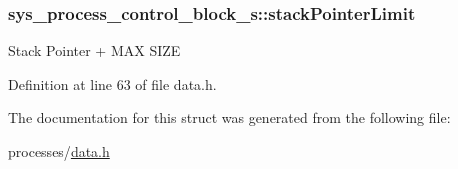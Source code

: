 \subsubsection[{stack\+Pointer\+Limit}]{ sys\+\_\+process\+\_\+control\+\_\+block\+\_\+s\+::stack\+Pointer\+Limit}\label{structsys__process__control__block__s_a6ace28a95ee3d1ae4f0e36aa2675cf51}
Stack Pointer + M\+A\+X S\+I\+Z\+E 

Definition at line 63 of file data.\+h.



The documentation for this struct was generated from the following file\+:\begin{DoxyCompactItemize}
\item 
processes/\hyperlink{data_8h}{data.\+h}\end{DoxyCompactItemize}
